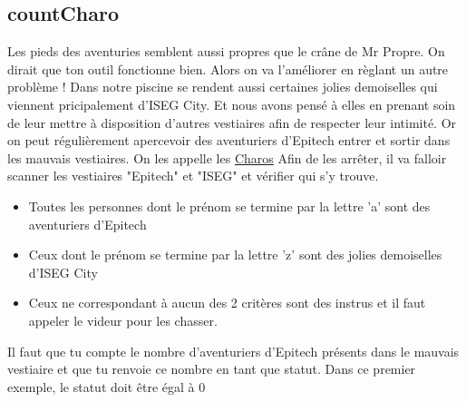 \documentclass[a4paper, 12pt]{article}
\begin{document}
{    \subsection{countCharo}

    Les pieds des aventuries semblent aussi propres que le crâne de Mr Propre.
    On dirait que ton outil fonctionne bien. Alors on va l'améliorer en règlant
    un autre problème !
    \newline \newline
    Dans notre piscine se rendent aussi certaines jolies demoiselles qui viennent pricipalement
    d'ISEG City. Et nous avons pensé à elles en prenant soin de leur mettre à disposition d'autres vestiaires
    afin de respecter leur intimité. Or on peut régulièrement apercevoir des aventuriers d'Epitech
    entrer et sortir dans les mauvais vestiaires.
    \newline \newline
    On les appelle les \underline{Charos}
    \newline \newline
    Afin de les arrêter, il va falloir scanner les vestiaires "Epitech" et "ISEG" et vérifier qui s'y trouve.
    \newline
    \begin{itemize}
        \item Toutes les personnes dont le prénom se termine par la lettre 'a' sont des aventuriers d'Epitech
        \item Ceux dont le prénom se termine par la lettre 'z' sont des jolies demoiselles d'ISEG City
        \item Ceux ne correspondant à aucun des 2 critères sont des instrus et il faut appeler le videur pour les chasser.
    \end{itemize}

    \vspace{0.6cm}

    Il faut que tu compte le nombre d'aventuriers d'Epitech présents dans le mauvais vestiaire et que
    tu renvoie ce nombre en tant que statut.
    \newline \newline
    Dans ce premier exemple, le statut doit être égal à 0

    
}
\end{document}
